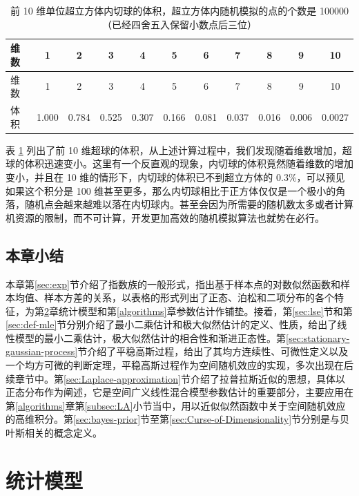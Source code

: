 \documentclass[12pt,a4paper,UTF8,twoside]{book}
\theoremstyle{definition}
\theoremstyle{definition}
\theoremstyle{definition}
\theoremstyle{remark}
\begin{document}
\begin{longtable}[]{@{}lcccccccccc@{}}
\caption{\label{tab:calculate-volume-of-hyperball} 前 10
维单位超立方体内切球的体积，超立方体内随机模拟的点的个数是
100000（已经四舍五入保留小数点后三位）}\tabularnewline
\toprule
维数 & 1 & 2 & 3 & 4 & 5 & 6 & 7 & 8 & 9 & 10\tabularnewline
\midrule
\endfirsthead
\toprule
维数 & 1 & 2 & 3 & 4 & 5 & 6 & 7 & 8 & 9 & 10\tabularnewline
\midrule
\endhead
体积 & 1.000 & 0.784 & 0.525 & 0.307 & 0.166 & 0.081 & 0.037 & 0.016 &
0.006 & 0.0027\tabularnewline
\bottomrule
\end{longtable}

表 \ref{tab:calculate-volume-of-hyperball} 列出了前 10
维超球的体积，从上述计算过程中，我们发现随着维数增加，超球的体积迅速变小。这里有一个反直观的现象，内切球的体积竟然随着维数的增加变小，并且在
10 维的情形下，内切球的体积已不到超立方体的
0.3\%，可以预见如果这个积分是 100
维甚至更多，那么内切球相比于正方体仅仅是一个极小的角落，随机点会越来越难以落在内切球内。甚至会因为所需要的随机数太多或者计算机资源的限制，而不可计算，开发更加高效的随机模拟算法也就势在必行。

\hypertarget{sec:foundations}{%
\section{本章小结}\label{sec:foundations}}

本章第\ref{sec:exp}节介绍了指数族的一般形式，指出基于样本点的对数似然函数和样本均值、样本方差的关系，以表格的形式列出了正态、泊松和二项分布的各个特征，为第\ref{models}章统计模型和第\ref{algorithms}章参数估计作铺垫。接着，第\ref{sec:lse}节和第\ref{sec:def-mle}节分别介绍了最小二乘估计和极大似然估计的定义、性质，给出了线性模型的最小二乘估计，极大似然估计的相合性和渐进正态性。第\ref{sec:stationary-gaussian-process}节介绍了平稳高斯过程，给出了其均方连续性、可微性定义以及一个均方可微的判断定理，平稳高斯过程作为空间随机效应的实现，多次出现在后续章节中。第\ref{sec:Laplace-approximation}节介绍了拉普拉斯近似的思想，具体以正态分布作为阐述，它是空间广义线性混合模型参数估计的重要部分，主要应用在第\ref{algorithms}章第\ref{subsec:LA}小节当中，用以近似似然函数中关于空间随机效应的高维积分。第\ref{sec:bayes-prior}节至第\ref{sec:Curse-of-Dimensionality}节分别是与贝叶斯相关的概念定义。

\hypertarget{models}{%
\chapter{统计模型}\label{models}}
\end{document}
